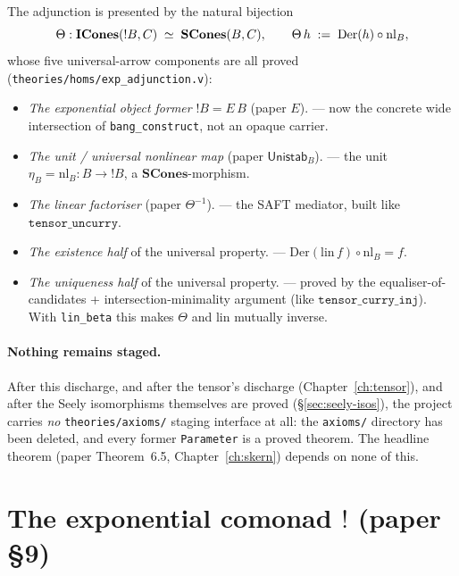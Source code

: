 The adjunction is presented by the natural bijection
\[
  \Theta : \mathbf{ICones}(\mathord{!}B, C) \;\simeq\; \mathbf{SCones}(B, C),
  \qquad
  \Theta\,h \;:=\; \mathrm{Der}(h) \circ \mathrm{nl}_B,
\]
whose five universal-arrow components are all proved
(\texttt{theories/homs/exp\_adjunction.v}):
\begin{itemize}
  \item \emph{The exponential object former} $\mathord{!}B = E\,B$
    (paper $E$).\label{def:bang-object}
    \rocqok{} --- now the
    concrete wide intersection of \texttt{bang\_construct}, not an
    opaque carrier.
  \item \emph{The unit / universal nonlinear map} (paper
    $\textsf{Unistab}_B$). \rocqok{}
    --- the unit $\eta_B = \mathrm{nl}_B : B \to \mathord{!}B$, a
    $\mathbf{SCones}$-morphism.
  \item \emph{The linear factoriser} (paper $\Theta^{-1}$).
    \rocqok{} --- the SAFT
    mediator, built like $\texttt{tensor\_uncurry}$.
  \item \emph{The existence half} of the universal property.
    \rocqok{} ---
    $\mathrm{Der}(\mathrm{lin}\,f) \circ \mathrm{nl}_B = f$.
  \item \emph{The uniqueness half} of the universal property.
    \rocqok{} ---
    proved by the equaliser-of-candidates + intersection-minimality
    argument (like $\texttt{tensor\_curry\_inj}$). With \texttt{lin\_beta}
    this makes $\Theta$ and $\mathrm{lin}$ mutually inverse.
\end{itemize}

\paragraph{Nothing remains staged.} After this discharge, and after the
tensor's discharge (Chapter~\ref{ch:tensor}), and after the Seely
isomorphisms themselves are proved (\S\ref{sec:seely-isos}), the project
carries \emph{no} \texttt{theories/axioms/} staging interface at all:
the \texttt{axioms/} directory has been deleted, and every former
\texttt{Parameter} is a proved theorem. The headline theorem (paper
Theorem~6.5, Chapter~\ref{ch:skern}) depends on none of this.

\section{The exponential comonad \texorpdfstring{$\mathord{!}$}{!} (paper \S9)}%
\label{sec:comonad}

